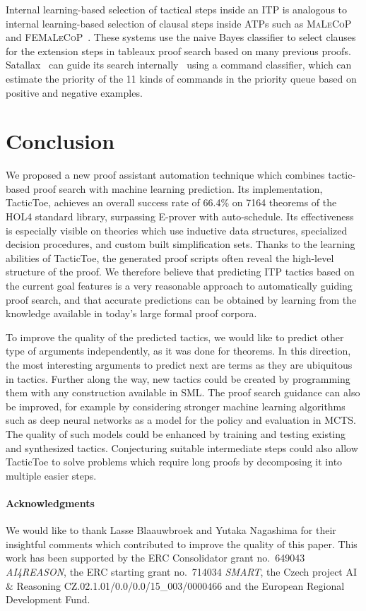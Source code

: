 \documentclass[runningheads,a4paper,draft]{svjour3}
\def\holfour{\textsf{HOL4}\xspace}
\def\eprover{\textsf{E-prover}\xspace}
\def\sml{\textsf{SML}\xspace}
\def\tactictoe{\textsf{TacticToe}\xspace}
\begin{document}
Internal learning-based selection of tactical steps inside an ITP is analogous
to internal learning-based selection of clausal steps inside ATPs such as
\textsc{MaLeCoP}~\cite{malecop} and \textsc{FEMaLeCoP}~\cite{femalecop}. These
systems
use the naive Bayes classifier to  select clauses for the extension steps in
tableaux proof search based on many previous proofs. Satallax~\cite{Brown2012a}
can guide its
search internally~\cite{mllax} using a command classifier, which can estimate
the priority of the 11 kinds of
commands in the priority queue based on positive and negative examples.

\section{Conclusion}\label{sec:concl}
We proposed a new proof assistant automation technique which combines
tactic-based proof search with machine learning prediction.
Its implementation, \tactictoe, achieves an overall success rate of 66.4\%
on 7164 theorems of the \holfour standard library, surpassing \eprover
with auto-schedule. Its
effectiveness is especially visible on
theories which use inductive data structures, specialized decision procedures,
and custom built simplification sets.
Thanks to the learning abilities of \tactictoe, the generated proof scripts
often reveal the high-level structure of the proof. %
We therefore believe that predicting ITP tactics based on the current goal
features is a very reasonable approach to automatically guiding proof search,
and that accurate predictions can be obtained by learning from the knowledge
available in today's large formal proof corpora.

To improve the quality of the predicted tactics,
we would like to predict other type of arguments independently, as it was done
for theorems. In this direction, the most interesting arguments to
predict next are terms as they are ubiquitous in tactics. Further along the way,
new tactics could be created by programming them with any construction
available in \sml.
The proof search guidance can also be improved, for example by considering
stronger machine learning algorithms
such as deep neural networks as a model for the policy and evaluation in MCTS.
The quality of such models could be enhanced by
training and testing existing and synthesized tactics.
Conjecturing suitable intermediate steps could also allow \tactictoe to solve
problems which require long proofs by decomposing it into multiple easier
steps.

\paragraph{Acknowledgments}\label{sect:acks}
We would like to thank Lasse Blaauwbroek and Yutaka Nagashima for their 
insightful comments which
contributed to improve the quality of this paper. This work has been supported
by the ERC Consolidator grant no.\ 649043 \textit{AI4REASON}, the ERC starting
grant no.\ 714034 \textit{SMART}, the Czech 
project AI \& Reasoning CZ.02.1.01/0.0/0.0/15\_003/0000466 and the 
European Regional Development Fund.



\end{document}
